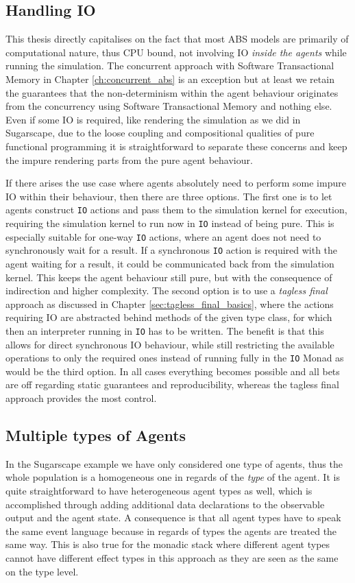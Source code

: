 \subsection{Handling IO}
This thesis directly capitalises on the fact that most ABS models are primarily of computational nature, thus CPU bound, not involving IO \textit{inside the agents} while running the simulation. The concurrent approach with Software Transactional Memory in Chapter \ref{ch:concurrent_abs} is an exception but at least we retain the guarantees that the non-determinism within the agent behaviour originates from the concurrency using Software Transactional Memory and nothing else. Even if some IO is required, like rendering the simulation as we did in Sugarscape, due to the loose coupling and compositional qualities of pure functional programming it is straightforward to separate these concerns and keep the impure rendering parts from the pure agent behaviour.

If there arises the use case where agents absolutely need to perform some impure IO within their behaviour, then there are three options. The first one is to let agents construct \texttt{IO} actions and pass them to the simulation kernel for execution, requiring the simulation kernel to run now in \texttt{IO} instead of being pure. This is especially suitable for one-way \texttt{IO} actions, where an agent does not need to synchronously wait for a result. If a synchronous \texttt{IO} action is required with the agent waiting for a result, it could be communicated back from the simulation kernel. This keeps the agent behaviour still pure, but with the consequence of indirection and higher complexity. The second option is to use a \textit{tagless final} approach as discussed in Chapter \ref{sec:tagless_final_basics}, where the actions requiring IO are abstracted behind methods of the given type class, for which then an interpreter running in \texttt{IO} has to be written. The benefit is that this allows for direct synchronous IO behaviour, while still restricting the available operations to only the required ones instead of running fully in the \texttt{IO} Monad as would be the third option. In all cases everything becomes possible and all bets are off regarding static guarantees and reproducibility, whereas the tagless final approach provides the most control.

\subsection{Multiple types of Agents}
In the Sugarscape example we have only considered one type of agents, thus the whole population is a homogeneous one in regards of the \textit{type} of the agent. It is quite straightforward to have heterogeneous agent types as well, which is accomplished through adding additional data declarations to the observable output and the agent state. A consequence is that all agent types have to speak the same event language because in regards of types the agents are treated the same way. This is also true for the monadic stack where different agent types cannot have different effect types in this approach as they are seen as the same on the type level.

